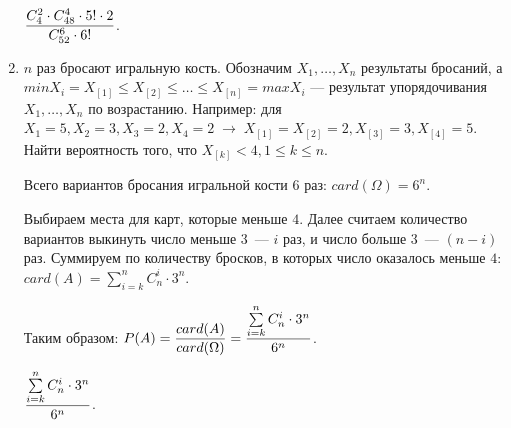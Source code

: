 \documentclass{article}
\begin{document}
\begin{enumerate}
    \answer{} $\displaystyle{\frac{C_4^2 \cdot C_{48}^{4} \cdot 5! \cdot 2}{C_{52}^6 \cdot 6!}}$.

    \item $n$ раз бросают игральную кость. Обозначим $X_1, \ldots, X_n$ результаты бросаний, а $min X_i = X_{[1]} \leq X_{[2]} \leq \ldots \leq X_{[n]} = max X_i$ — результат упорядочивания $X_1, \ldots, X_n$ по возрастанию. Например: для $X_1 = 5, X_2 = 3, X_3 = 2, X_4 = 2 \; \rightarrow \; X_{[1]} = X_{[2]} = 2, X_{[3]} = 3, X_{[4]} = 5$. Найти вероятность того, что $X_{[k]} < 4, 1 \leq k \leq n$.

    \solution{}

    Всего вариантов бросания игральной кости $6$ раз: $card(\Omega) = 6 ^ n$.

    Выбираем места для карт, которые меньше $4$. Далее считаем количество вариантов выкинуть число меньше $3$~--- $i$ раз, и число больше $3$~--- $(n − i)$ раз. Суммируем по количеству бросков, в которых число оказалось меньше $4$: $card(A) = \sum\limits_{i = k}^n C_n^i \cdot 3 ^ n$.

    Таким образом: $\displaystyle{P(A) = \frac{card(A)}{card(\Omega)} = \frac{\sum\limits_{i = k}^n C_n^i \cdot 3 ^ n}{6 ^ n}}$.

    \answer{} $\displaystyle{\frac{\sum\limits_{i = k}^n C_n^i \cdot 3 ^ n}{6 ^ n}}$.
\end{enumerate}
\end{document}
